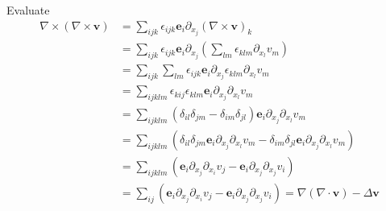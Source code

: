 \documentclass[12pt]{article}
\begin{document}
\begin{mdframed}
	Evaluate
	\begin{align}
		\nabla\times(\nabla\times\bm{v})
		 & = \sum\limits_{ijk}\epsilon_{ijk}\bm{e}_i\partial_{x_j}(\nabla\times\bm{v})_k                                                                                                                     \\
		 & = \sum\limits_{ijk}\epsilon_{ijk}\bm{e}_i\partial_{x_j} \left( \sum\limits_{lm} \epsilon_{klm}\partial_{x_l}v_m \right)                                                                           \\
		 & = \sum\limits_{ijk}\sum\limits_{lm}\epsilon_{ijk}\bm{e}_i\partial_{x_j}\epsilon_{klm}\partial_{x_l}v_m                                                                                            \\
		 & = \sum\limits_{ijklm} \epsilon_{kij}\epsilon_{klm} \bm{e}_i\partial_{x_j}\partial_{x_l}v_m                                                                         \label{eq:epsilonepsilon}      \\
		 & = \sum\limits_{ijklm} \left( \delta_{il}\delta_{jm} - \delta_{im}\delta_{jl} \right)\bm{e}_i\partial_{x_j}\partial_{x_l}v_m                                        \label{eq:deltafour}           \\
		 & = \sum\limits_{ijklm} \left( \delta_{il}\delta_{jm}\bm{e}_i\partial_{x_j}\partial_{x_l}v_m - \delta_{im}\delta_{jl}\bm{e}_i\partial_{x_j}\partial_{x_l}v_m \right) \label{eq:deltafourtwo}        \\
		 & = \sum\limits_{ijklm} \left( \bm{e}_i\partial_{x_j}\partial_{x_i}v_j - \bm{e}_i\partial_{x_j}\partial_{x_j}v_i \right)                                             \label{eq:deltafourtwoshorter} \\
		 & = \sum\limits_{ij}\left( \bm{e}_i\partial_{x_j}\partial_{x_i}v_j-\bm{e}_i\partial_{x_j}\partial_{x_j}v_i\right) = \nabla (\nabla\cdot\bm{v})-\Delta \bm{v}
	\end{align}
\end{mdframed}
\end{document}
